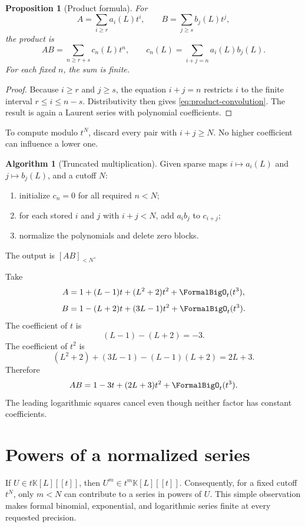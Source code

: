 \documentclass[11pt,openany]{book}
\theoremstyle{definition}
\newtheorem{algorithm}{Algorithm}[chapter]
\theoremstyle{plain}
\newtheorem{proposition}{Proposition}[chapter]
\theoremstyle{remark}
\newcommand{\K}{\mathbb{K}}
\begin{document}
\begin{proposition}[Product formula]\label{prop:product-formula}
For
\[
 A=\sum_{i\ge r}a_i(L)t^i,
 \qquad
 B=\sum_{j\ge s}b_j(L)t^j,
\]
the product is
\begin{equation}\label{eq:product-convolution}
 AB=\sum_{n\ge r+s}c_n(L)t^n,
 \qquad
 c_n(L)=\sum_{i+j=n}a_i(L)b_j(L).
\end{equation}
For each fixed \(n\), the sum is finite.
\end{proposition}
\begin{proof}
Because \(i\ge r\) and \(j\ge s\), the equation \(i+j=n\) restricts
\(i\) to the finite interval \(r\le i\le n-s\).  Distributivity then gives
\cref{eq:product-convolution}.  The result is again a Laurent series with
polynomial coefficients.
\end{proof}

To compute modulo \(t^N\), discard every pair with \(i+j\ge N\).  No higher
coefficient can influence a lower one.

\begin{algorithm}[Truncated multiplication]\label{alg:mul}
Given sparse maps \(i\mapsto a_i(L)\) and \(j\mapsto b_j(L)\), and a cutoff
\(N\):
\begin{enumerate}
\item initialize \(c_n=0\) for all required \(n<N\);
\item for each stored \(i\) and \(j\) with \(i+j<N\), add \(a_i b_j\) to
      \(c_{i+j}\);
\item normalize the polynomials and delete zero blocks.
\end{enumerate}
The output is \([AB]_{<N}\).
\end{algorithm}

\begin{workedbox}
Take
\[
 A=1+(L-1)t+(L^2+2)t^2+\FormalBigO_t(t^3),
\]
\[
 B=1-(L+2)t+(3L-1)t^2+\FormalBigO_t(t^3).
\]
The coefficient of \(t\) is
\[
 (L-1)-(L+2)=-3.
\]
The coefficient of \(t^2\) is
\[
 (L^2+2)+(3L-1)-(L-1)(L+2)=2L+3.
\]
Therefore
\[
 AB=1-3t+(2L+3)t^2+\FormalBigO_t(t^3).
\]
The leading logarithmic squares cancel even though neither factor has constant
coefficients.
\end{workedbox}

\section{Powers of a normalized series}
If \(U\in t\K[L][[t]]\), then \(U^m\in t^m\K[L][[t]]\).  Consequently, for a
fixed cutoff \(t^N\), only \(m<N\) can contribute to a series in powers of
\(U\).  This simple observation makes formal binomial, exponential, and
logarithmic series finite at every requested precision.
\end{document}
